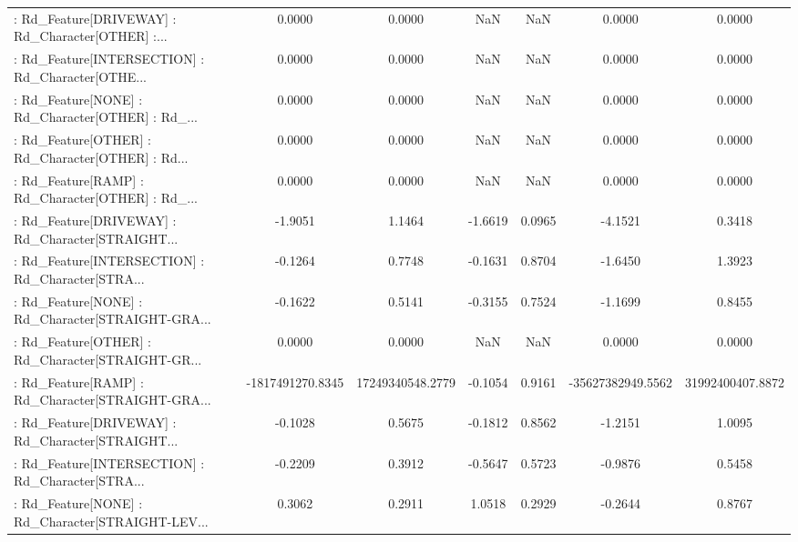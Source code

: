 \begin{longtable}{p{4cm}cccccc}
 : Rd\_Feature[DRIVEWAY] : Rd\_Character[OTHER] :... &            0.0000 &            0.0000 &     NaN &          NaN &             0.0000 &            0.0000 \\
 : Rd\_Feature[INTERSECTION] : Rd\_Character[OTHE... &            0.0000 &            0.0000 &     NaN &          NaN &             0.0000 &            0.0000 \\
 : Rd\_Feature[NONE] : Rd\_Character[OTHER] : Rd\_... &            0.0000 &            0.0000 &     NaN &          NaN &             0.0000 &            0.0000 \\
 : Rd\_Feature[OTHER] : Rd\_Character[OTHER] : Rd... &            0.0000 &            0.0000 &     NaN &          NaN &             0.0000 &            0.0000 \\
 : Rd\_Feature[RAMP] : Rd\_Character[OTHER] : Rd\_... &            0.0000 &            0.0000 &     NaN &          NaN &             0.0000 &            0.0000 \\
 : Rd\_Feature[DRIVEWAY] : Rd\_Character[STRAIGHT... &           -1.9051 &            1.1464 & -1.6619 &       0.0965 &            -4.1521 &            0.3418 \\
 : Rd\_Feature[INTERSECTION] : Rd\_Character[STRA... &           -0.1264 &            0.7748 & -0.1631 &       0.8704 &            -1.6450 &            1.3923 \\
 : Rd\_Feature[NONE] : Rd\_Character[STRAIGHT-GRA... &           -0.1622 &            0.5141 & -0.3155 &       0.7524 &            -1.1699 &            0.8455 \\
 : Rd\_Feature[OTHER] : Rd\_Character[STRAIGHT-GR... &            0.0000 &            0.0000 &     NaN &          NaN &             0.0000 &            0.0000 \\
 : Rd\_Feature[RAMP] : Rd\_Character[STRAIGHT-GRA... &  -1817491270.8345 &  17249340548.2779 & -0.1054 &       0.9161 &  -35627382949.5562 &  31992400407.8872 \\
 : Rd\_Feature[DRIVEWAY] : Rd\_Character[STRAIGHT... &           -0.1028 &            0.5675 & -0.1812 &       0.8562 &            -1.2151 &            1.0095 \\
 : Rd\_Feature[INTERSECTION] : Rd\_Character[STRA... &           -0.2209 &            0.3912 & -0.5647 &       0.5723 &            -0.9876 &            0.5458 \\
 : Rd\_Feature[NONE] : Rd\_Character[STRAIGHT-LEV... &            0.3062 &            0.2911 &  1.0518 &       0.2929 &            -0.2644 &            0.8767 \\

\end{longtable}
